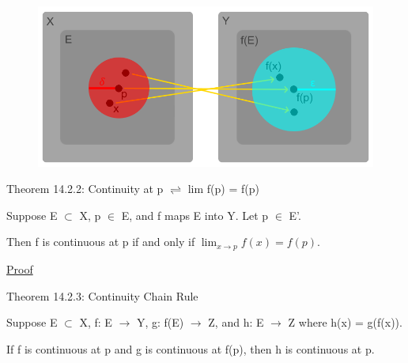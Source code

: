 \begin{figure}[h]
	\centering
	\includegraphics[scale=0.38]{Images/14.2.1.png}
\end{figure}

{ \color{red} Theorem 14.2.2: Continuity at p $\rightleftharpoons$ lim f(p) = f(p) }

    \begin{adjustbox}{minipage=14cm, right, vspace=0.1cm 0cm}
        Suppose E $\subset$ X, p $\in$ E, and
        f maps E into Y. Let p $\in$ E'.

        Then f is continuous at p if and only if
        $\lim_{x \rightarrow p} f(x) = f(p)$.
    \end{adjustbox}

{ \color{magenta} \underline{Proof} }


    \vspace{0.5cm}

{ \color{red} Theorem 14.2.3: Continuity Chain Rule }

    \begin{adjustbox}{minipage=14cm, right, vspace=0.1cm 0cm}
        Suppose E $\subset$ X, f: E $\rightarrow$ Y, g: f(E) $\rightarrow$ Z,
        and h: E $\rightarrow$ Z where h(x) = g(f(x)).

        If f is continuous at p and g is continuous at f(p),
        then h is continuous at p.
    \end{adjustbox}

